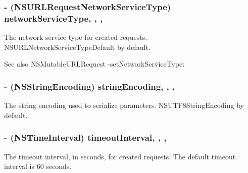 \subsubsection[{network\+Service\+Type}]{\setlength{\rightskip}{0pt plus 5cm}-\/ (N\+S\+U\+R\+L\+Request\+Network\+Service\+Type) network\+Service\+Type\hspace{0.3cm}{\ttfamily [read]}, {\ttfamily [write]}, {\ttfamily [nonatomic]}, {\ttfamily [assign]}}\label{interface_a_f_h_t_t_p_request_serializer_a5606b2650ff3860a4ae94ea06f2b1d9c}
The network service type for created requests. {\ttfamily N\+S\+U\+R\+L\+Network\+Service\+Type\+Default} by default.

\begin{DoxySeeAlso}{See also}
N\+S\+Mutable\+U\+R\+L\+Request -\/set\+Network\+Service\+Type\+: 
\end{DoxySeeAlso}
\hypertarget{interface_a_f_h_t_t_p_request_serializer_adbc30f08c984b2ca0922d871bf625d8f}{}
\subsubsection[{string\+Encoding}]{\setlength{\rightskip}{0pt plus 5cm}-\/ (N\+S\+String\+Encoding) string\+Encoding\hspace{0.3cm}{\ttfamily [read]}, {\ttfamily [write]}, {\ttfamily [nonatomic]}, {\ttfamily [assign]}}\label{interface_a_f_h_t_t_p_request_serializer_adbc30f08c984b2ca0922d871bf625d8f}
The string encoding used to serialize parameters. {\ttfamily N\+S\+U\+T\+F8\+String\+Encoding} by default. \hypertarget{interface_a_f_h_t_t_p_request_serializer_aaf4bf60cd1896ade2788764892496812}{}
\subsubsection[{timeout\+Interval}]{\setlength{\rightskip}{0pt plus 5cm}-\/ (N\+S\+Time\+Interval) timeout\+Interval\hspace{0.3cm}{\ttfamily [read]}, {\ttfamily [write]}, {\ttfamily [nonatomic]}, {\ttfamily [assign]}}\label{interface_a_f_h_t_t_p_request_serializer_aaf4bf60cd1896ade2788764892496812}
The timeout interval, in seconds, for created requests. The default timeout interval is 60 seconds.

